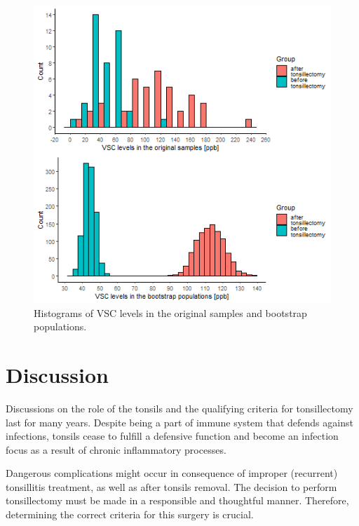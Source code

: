 \documentclass[12pt,a4paper,notitlepage]{report}
\begin{document}
\begin{figure}[H]
	\centering
	\includegraphics[width=.9\textwidth, height=.85\textwidth]{./Figures/Fig_3.4}
	\caption{Histograms of VSC levels in the original samples and bootstrap populations.}
	\label{fig:Fig_3.4}
\end{figure}	


\chapter{Discussion}


Discussions on the role of the tonsils and the qualifying criteria for tonsillectomy last for many years. 
Despite being a part of immune system that defends against infections, tonsils cease to fulfill a defensive function and become an infection focus as a result of chronic inflammatory processes.

Dangerous complications might occur in consequence of improper (recurrent) tonsillitis treatment, as well as after tonsils removal. The decision to perform tonsillectomy must be made in a responsible and thoughtful manner. Therefore, determining the correct criteria for this surgery is crucial.
\end{document}
